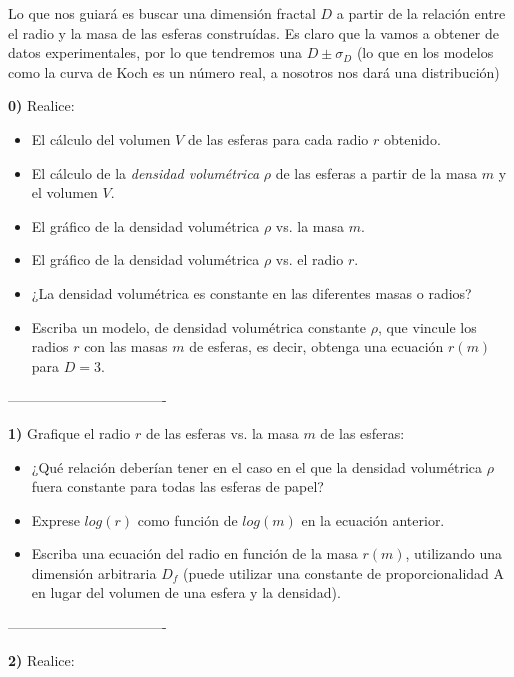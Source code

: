 \documentclass[10pt,a4paper]{article}
\numberwithin{equation}{section}
\begin{document}
Lo que nos guiará es buscar una dimensión fractal $D$ a partir de la relación entre el radio y la masa de las esferas construídas. Es claro que la vamos a obtener de datos experimentales, por lo que tendremos una $D \pm \sigma_D$ (lo que en los modelos como la curva de Koch es un número real, a nosotros nos dará una distribución)


\noindent \textbf{0)}  Realice:
\begin{itemize}
\item[$\bullet$] El cálculo del volumen $V$ de las esferas para cada radio $r$ obtenido.
\item[$\bullet$] El cálculo de la \textit{densidad volumétrica} $\rho$ de las esferas a partir de la masa $m$ y el volumen $V$.
\item[$\bullet$] El gráfico de la densidad volumétrica $\rho$ vs. la masa $m$. 
\item[$\bullet$] El gráfico de la densidad volumétrica $\rho$ vs. el radio $r$. 
\end{itemize}

\begin{itemize}
\item[a)] ¿La densidad volumétrica es constante en las diferentes masas o radios?
\item[b)] Escriba un modelo, de densidad volumétrica constante $\rho$, que vincule los radios $r$ con las masas $m$ de esferas, es decir, obtenga una ecuación $r(m)$ para $D = 3$.
\end{itemize}


\-----------------------------------

\noindent \textbf{1)} Grafique el radio $r$ de las esferas vs. la masa $m$ de las esferas:

\begin{itemize}
\item[a)] ¿Qué relación deberían tener en el caso en el que la densidad volumétrica $\rho$ fuera constante para todas las esferas de papel?
\item[b)] Exprese $log(r)$ como función de $log(m)$  en la ecuación anterior.
\item[c)] Escriba una ecuación del radio en función de la masa $r(m)$, utilizando una dimensión arbitraria $D_f$ (puede utilizar una constante de proporcionalidad A en lugar del volumen de una esfera y la densidad).
\end{itemize}


\-----------------------------------

\noindent \textbf{2)} Realice:
\end{document}
